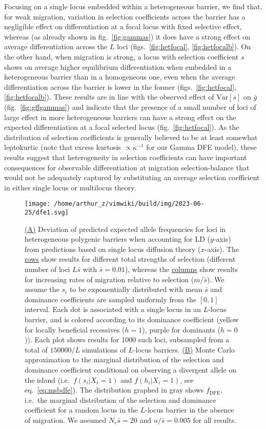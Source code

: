 \documentclass[
  11pt,
]{article}
\begin{document}
Focusing on a single locus embedded within a heterogeneous barrier, we
find that, for weak migration, variation in selection coefficients
across the barrier has a negligible effect on differentiation at a focal
locus with fixed selective effect, whereas (as already shown in
fig.~\ref{fig:gammas}) it does have a strong effect on average
differentiation across the \(L\) loci
(figs.~\ref{fig:hetfocal}, \ref{fig:hetfocalb}). On the other hand, when
migration is strong, a locus with selection coefficient \(s\) shows on
average higher equilibrium differentiation when embedded in a
heterogeneous barrier than in a homogeneous one, even when the average
differentiation across the barrier is lower in the former
(figs.~\ref{fig:hetfocal}, \ref{fig:hetfocalb}). These results are in
line with the observed effect of \(\mathrm{Var}[s]\) on \(\bar{g}\)
(fig.~\ref{fig:gffgammas}) and indicate that the presence of a small
number of loci of large effect in more heterogeneous barriers can have a
strong effect on the expected differentiation at a focal selected locus
(fig.~\ref{fig:hetfocal}). As the distribution of selection coefficients
is generally believed to be at least somewhat leptokurtic (note that
excess kurtosis \(\propto \kappa^{-1}\) for our Gamma DFE model), these
results suggest that heterogeneity in selection coefficients can have
important consequences for observable differentiation at migration
selection-balance that would not be adequately captured by substituting
an average selection coefficient in either single locus or multilocus
theory.

\begin{figure}
\centering
\texttt{[image: /home/arthur\_z/vimwiki/build/img/2023-06-25/dfe1.svg]}
\caption{\uline{(A)} Deviation of predicted expected allele frequencies
for loci in heterogeneous polygenic barriers when accounting for LD
(\(y\)-axis) from predictions based on single locus diffusion theory
(\(x\)-axis). The \uline{rows} show results for different total
strengths of selection (different number of loci \(L\bar{s}\) with
\(\bar{s} = 0.01\)), whereas the \uline{columns} show results for
increasing rates of migration relative to selection (\(m/\bar{s}\)). We
assume the \(s_i\) to be exponentially distributed with mean \(\bar{s}\)
and dominance coefficients are sampled uniformly from the \([0,1]\)
interval. Each dot is associated with a single locus in an \(L\)-locus
barrier, and is colored according to its dominance coefficient (yellow
for locally beneficial recessives (\(h=1\)), purple for dominants
(\(h=0\))). Each plot shows results for 1000 such loci, subsampled from
a total of \(150000/L\) simulations of \(L\)-locus barriers. \uline{(B)}
Monte Carlo approximation to the marginal distribution of the selection
and dominance coefficient conditional on observing a divergent allele on
the island (i.e.~\(f(s_i|X_i=1)\) and \(f(h_i|X_i=1)\), see
eq.~\ref{eq:msbdfe}). The distribution graphed in gray shows
\(f_\text{DFE}\), i.e.~the marginal distribution of the selection and
dominance coefficient for a random locus in the \(L\)-locus barrier in
the absence of migration. We assumed \(N_e\bar{s} = 20\) and
\(u/\bar{s} = 0.005\) for all results. \label{fig:diffdetail}}
\end{figure}
\end{document}
